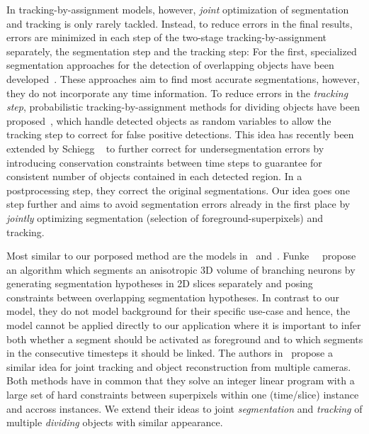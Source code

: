 \documentclass[10pt,twocolumn,letterpaper]{article}
\begin{document}
In tracking-by-assignment models, however, \emph{joint} optimization of segmentation and tracking is only rarely tackled. 
Instead, to reduce errors in the final results, errors are minimized in each step of the two-stage tracking-by-assignment separately,
the segmentation step and the tracking step:
For the first, specialized segmentation approaches for the detection of overlapping objects have been 
developed~\cite{park_13_segmentation,arte_13_learning}. These approaches aim to find most accurate segmentations, however,
they do not incorporate any time information.
To reduce errors in the \emph{tracking step}, probabilistic tracking-by-assignment methods for dividing objects 
have been proposed~\cite{kausler_12_discrete,bise_11_reliable}, which handle 
detected objects as random variables to allow the tracking step to correct for false positive detections. This idea
has recently been extended by Schiegg \etal~\cite{schiegg_13_conservation} to further correct for undersegmentation errors
by introducing conservation constraints between time steps to guarantee for consistent number of objects contained in 
each detected region. In a postprocessing step, they correct the original segmentations. Our idea goes one step further
and aims to avoid segmentation errors already in the first place by \emph{jointly} optimizing segmentation (\ie selection 
of foreground-superpixels) and tracking.

Most similar to our porposed method are the models in~\cite{funke_12_efficient} and~\cite{hofmann_13_hypergraphs}.
Funke~\etal~\cite{funke_12_efficient} propose an algorithm 
which segments an anisotropic 3D volume of branching neurons by generating
segmentation hypotheses in 2D slices separately and posing constraints between overlapping segmentation hypotheses. 
In contrast to our model, they do not model background for their specific use-case and hence, the model cannot be applied directly 
to our application where it is important to infer both whether a segment should be activated as foreground and to which segments in the
consecutive timesteps it should be linked. The authors in~\cite{hofmann_13_hypergraphs} propose a similar idea for 
joint tracking and object reconstruction from multiple cameras. Both methods have in common that they 
solve an integer linear program with a large set of hard constraints between superpixels within one (time/slice) instance and accross
instances. We extend their ideas to joint \emph{segmentation} and \emph{tracking} of multiple \emph{dividing} objects with similar 
appearance.
\end{document}

